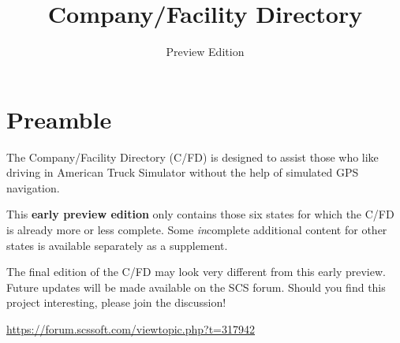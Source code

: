 
\subject{City location descriptions for ATS}
\title{Company\!/Facility Directory}
\subtitle{Preview Edition}


\usepackage{scrlayer-scrpage}  %



\maketitle

\section*{Preamble}

{
\justifying

The Company/Facility Directory (C/FD) is designed to assist those who like driving in American Truck Simulator without the help of simulated GPS navigation.

This \textbf{early preview edition} only contains those six states for which the C/FD is already more or less complete.
Some \emph{in}complete additional content for other states is available separately as a supplement.



The final edition of the C/FD may look very different from this early preview.
Future updates will be made available on the SCS forum.
Should you find this project interesting, please join the discussion!

\centering \vspace{1ex}
\url{https://forum.scssoft.com/viewtopic.php?t=317942} \par
}

